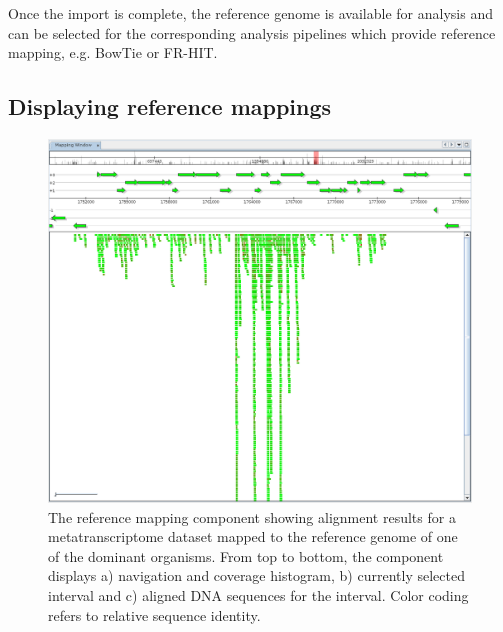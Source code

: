 Once the import is complete, the reference genome is available for analysis and
can be selected for the corresponding analysis pipelines which provide reference
mapping, e.g. BowTie or FR-HIT.

\subsection{Displaying reference mappings}

\begin{figure}[H]
\centering
\includegraphics[width=\textwidth]{img/mgx/RefMapping}
\caption[Reference mapping]{The reference mapping component showing alignment results for a metatranscriptome dataset mapped to the reference genome of one of the dominant organisms. From top to bottom, the component displays a) navigation and coverage histogram, b) currently selected interval and c) aligned DNA sequences for the interval. Color coding refers to relative sequence identity.}
\label{refmap}
\end{figure}

